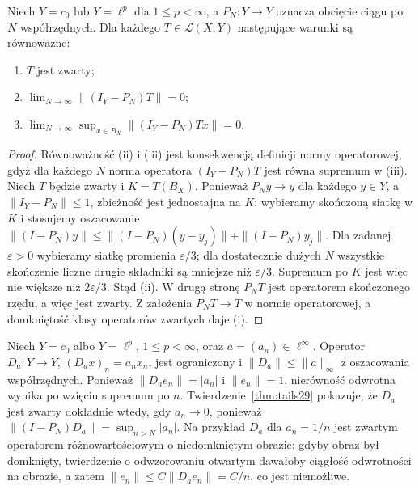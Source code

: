 \begin{twierdzenie}
\label{thm:tails29}
Niech $Y=c_0$ lub $Y=\ell^p$ dla $1\le p<\infty$,
a $P_N:Y\to Y$ oznacza obcięcie ciągu po $N$ współrzędnych.
Dla każdego $T\in\mathcal L(X,Y)$ następujące warunki są
równoważne:
\begin{enumerate}[label=\textup{(\roman*)}]
\item $T$ jest zwarty;
\item $\lim_{N\to\infty}\|(I_Y-P_N)T\|=0$;
\item $\lim_{N\to\infty}\sup_{x\in B_X}
      \|(I_Y-P_N)Tx\|=0$.
\end{enumerate}
\end{twierdzenie}
\begin{proof}
Równoważność (ii) i (iii) jest konsekwencją definicji normy
operatorowej, gdyż dla każdego $N$ norma operatora
$(I_Y-P_N)T$ jest równa supremum w (iii).
Niech $T$ będzie zwarty i $K=\overline{T(B_X)}$.
Ponieważ $P_Ny\to y$ dla każdego $y\in Y$, a
$\|I_Y-P_N\|\le1$, zbieżność jest jednostajna na $K$:
wybieramy skończoną siatkę w $K$ i stosujemy oszacowanie
$\|(I-P_N)y\|\le\|(I-P_N)(y-y_j)\|+
\|(I-P_N)y_j\|$. Dla zadanej $\varepsilon>0$ wybieramy
siatkę promienia $\varepsilon/3$; dla dostatecznie dużych $N$
wszystkie skończenie liczne drugie składniki są mniejsze
niż $\varepsilon/3$. Supremum po $K$ jest więc nie większe
niż $2\varepsilon/3$. Stąd (ii).
W drugą stronę $P_NT$ jest operatorem skończonego rzędu,
a więc jest zwarty. Z założenia $P_NT\to T$ w normie
operatorowej, a domkniętość klasy operatorów zwartych
daje (i).
\end{proof}

\begin{przyklad}
\label{ex:diagonal29}
Niech $Y=c_0$ albo $Y=\ell^p$, $1\le p<\infty$,
oraz $a=(a_n)\in\ell^\infty$. Operator
$D_a:Y\to Y$, $(D_ax)_n=a_nx_n$, jest ograniczony
i $\|D_a\|\le\|a\|_\infty$ z oszacowania współrzędnych.
Ponieważ $\|D_ae_n\|=|a_n|$ i $\|e_n\|=1$, nierówność
odwrotna wynika po wzięciu supremum po $n$. Twierdzenie~\ref{thm:tails29}
pokazuje, że $D_a$ jest zwarty dokładnie wtedy, gdy
$a_n\to0$, ponieważ
$\|(I-P_N)D_a\|=\sup_{n>N}|a_n|$.
Na przykład $D_a$ dla $a_n=1/n$ jest zwartym
operatorem różnowartościowym o niedomkniętym obrazie:
gdyby obraz był domknięty, twierdzenie o odwzorowaniu
otwartym dawałoby ciągłość odwrotności na obrazie, a zatem
$\|e_n\|\le C\|D_ae_n\|=C/n$, co jest niemożliwe.
\end{przyklad}

